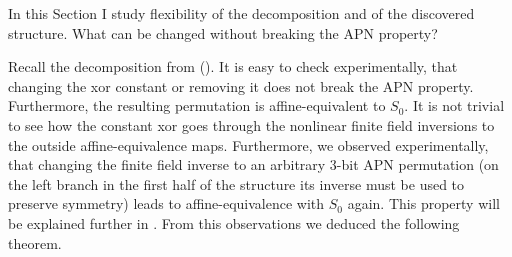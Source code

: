 
In this Section I study flexibility of the decomposition and of the discovered structure. What can be changed without breaking the APN property?


Recall the decomposition from  (). It is easy to check experimentally, that changing the xor constant or removing it does not break the APN property. Furthermore, the resulting permutation is affine-equivalent to $S_0$. It is not trivial to see how the constant xor goes through the nonlinear finite field inversions to the outside affine-equivalence maps. Furthermore, we observed experimentally, that changing the finite field inverse to an arbitrary 3-bit APN permutation (on the left branch in the first half of the structure its inverse must be used to preserve symmetry) leads to affine-equivalence with $S_0$ again. This property will be explained further in . From this observations we deduced the following theorem.


